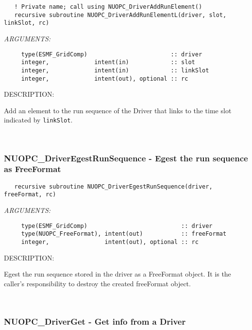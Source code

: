   
\begin{verbatim}   ! Private name; call using NUOPC_DriverAddRunElement()
   recursive subroutine NUOPC_DriverAddRunElementL(driver, slot, linkSlot, rc)\end{verbatim}{\em ARGUMENTS:}
\begin{verbatim}     type(ESMF_GridComp)                        :: driver
     integer,             intent(in)            :: slot
     integer,             intent(in)            :: linkSlot
     integer,             intent(out), optional :: rc \end{verbatim}
{\sf DESCRIPTION:\\ }


   Add an element to the run sequence of the Driver that links to the time slot
   indicated by {\tt linkSlot}. 
 
\mbox{}\hrulefill\ 
 
\subsubsection [NUOPC\_DriverEgestRunSequence] {NUOPC\_DriverEgestRunSequence - Egest the run sequence as FreeFormat}


  
\begin{verbatim}   recursive subroutine NUOPC_DriverEgestRunSequence(driver, freeFormat, rc)\end{verbatim}{\em ARGUMENTS:}
\begin{verbatim}     type(ESMF_GridComp)                           :: driver
     type(NUOPC_FreeFormat), intent(out)           :: freeFormat
     integer,                intent(out), optional :: rc \end{verbatim}
{\sf DESCRIPTION:\\ }


   Egest the run sequence stored in the driver as a FreeFormat object. It is the
   caller's responsibility to destroy the created freeFormat object. 
 
\mbox{}\hrulefill\ 
 
\subsubsection [NUOPC\_DriverGet] {NUOPC\_DriverGet - Get info from a Driver}



